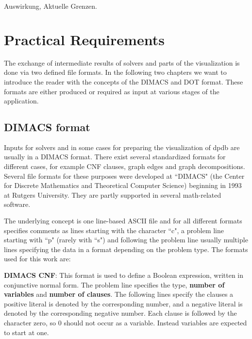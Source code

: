 \documentclass[a4paper, 12pt, bibliography=totoc]{scrartcl}
\begin{document}
Auswirkung, Aktuelle Grenzen.

\newpage
\section{Practical Requirements}\label{sec:practicalreq}
The exchange of intermediate results of solvers and parts of the visualization is done via two defined file formats. In the following two chapters we want to introduce the reader with the concepts of the DIMACS and DOT format. These formats are either produced or required as input at various stages of the application.
  
\subsection{DIMACS format}

Inputs for solvers and in some cases for preparing the visualization of dpdb are usually in a DIMACS format. There exist several standardized formats for different cases, for example CNF clauses, graph edges and graph decompositions.
Several file formats for these purposes were developed at ``DIMACS" (the Center for Discrete Mathematics and Theoretical Computer Science) \cite{dimacsimplcha} beginning in 1993 at Rutgers University.
They are partly supported in several math-related software.

The underlying concept is one line-based ASCII file and for all different formats specifies comments as lines starting with the character ``c", a problem line starting with ``p" (rarely with ``s") and following the problem line usually multiple lines specifying the data in a format depending on the problem type.
The formats used for this work are:

\textbf{DIMACS CNF}: This format is used to define a Boolean expression, written in conjunctive normal form. The problem line specifies the type, \textbf{number of variables} and \textbf{number of clauses}. The following lines specify the clauses a positive literal is denoted by the corresponding number, and a negative literal is denoted by the corresponding negative number. Each clause is followed by the character zero, so 0 should not occur as a variable. Instead variables are expected to start at one.\\
\end{document}
